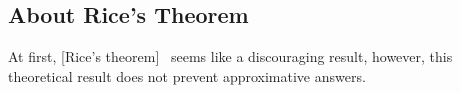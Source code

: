 \subsection{About Rice's Theorem}\label{subsec:rice}

At first, [Rice's theorem]~\cite{rice1953} seems like a discouraging result, however, this theoretical result does not prevent approximative answers.

